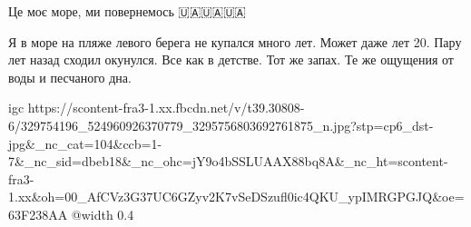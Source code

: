  
 
 
 
 

\qqSecCmt


Це моє море, ми повернемось 🇺🇦🇺🇦🇺🇦


Я в море на пляже левого берега не купался много лет. Может даже лет 20. Пару
лет назад сходил окунулся. Все как в детстве. Тот же запах. Те же ощущения от
воды и песчаного дна.


\ifcmt
  igc https://scontent-fra3-1.xx.fbcdn.net/v/t39.30808-6/329754196_524960926370779_3295756803692761875_n.jpg?stp=cp6_dst-jpg&_nc_cat=104&ccb=1-7&_nc_sid=dbeb18&_nc_ohc=jY9o4bSSLUAAX88bq8A&_nc_ht=scontent-fra3-1.xx&oh=00_AfCVz3G37UC6GZyv2K7vSeDSzufl0ic4QKU_ypIMRGPGJQ&oe=63F238AA
	@width 0.4
\fi
